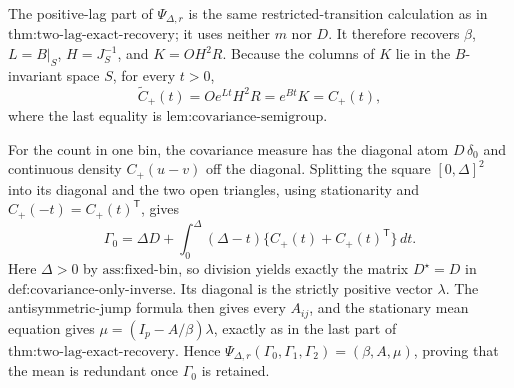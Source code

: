 The positive-lag part of \(\Psi_{\Delta,r}\) is the same restricted-transition calculation as in \(\text{thm:two-lag-exact-recovery}\); it uses neither \(m\) nor \(D\).  It therefore recovers \(\beta\), \(L=B|_S\), \(H=J_S^{-1}\), and \(K=OH^2R\).  Because the columns of \(K\) lie in the \(B\)-invariant space \(S\), for every \(t>0\),
\[
 \widetilde C_+(t)=Oe^{Lt}H^2R=e^{Bt}K=C_+(t),
\]
where the last equality is \(\text{lem:covariance-semigroup}\).

For the count in one bin, the covariance measure has the diagonal atom \(D\,\delta_0\) and continuous density \(C_+(u-v)\) off the diagonal.  Splitting the square \([0,\Delta]^2\) into its diagonal and the two open triangles, using stationarity and \(C_+(-t)=C_+(t)^{\mathsf T}\), gives
\[
 \Gamma_0=\Delta D+\int_0^\Delta(\Delta-t)\{C_+(t)+C_+(t)^{\mathsf T}\}\,dt.
\]
Here \(\Delta>0\) by \(\text{ass:fixed-bin}\), so division yields exactly the matrix \(D^\star=D\) in \(\text{def:covariance-only-inverse}\).  Its diagonal is the strictly positive vector \(\lambda\).  The antisymmetric-jump formula then gives every \(A_{ij}\), and the stationary mean equation gives \(\mu=(I_p-A/\beta)\lambda\), exactly as in the last part of \(\text{thm:two-lag-exact-recovery}\).  Hence \(\Psi_{\Delta,r}(\Gamma_0,\Gamma_1,\Gamma_2)=(\beta,A,\mu)\), proving that the mean is redundant once \(\Gamma_0\) is retained.
